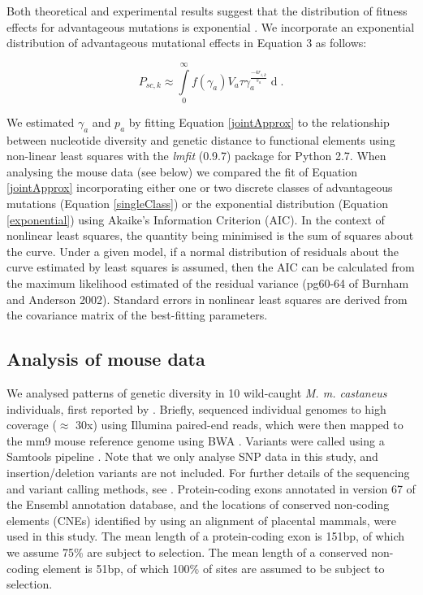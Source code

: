 	Both theoretical and experimental results suggest that the distribution of fitness effects for advantageous mutations is exponential \citep{RN109}. We incorporate an exponential distribution of advantageous mutational effects in Equation 3 as follows:

		\begin{equation}
		\label{exponential}
P_{sc,k} \approx \int \limits_{0}^{\infty} f(\gamma_a) V_a \tau\gamma_a^{\frac{-4r_{i,k}}{s_a}} \mathop{d\gamma_a}.
		\end{equation}

	We estimated $\gamma_a$ and $p_a$ by fitting Equation \ref{jointApprox} to the relationship between nucleotide diversity and genetic distance to functional elements using non-linear least squares with the \emph{lmfit} (0.9.7) package for Python 2.7. When analysing the mouse data (see below) we compared the fit of Equation \ref{jointApprox} incorporating either one or two discrete classes of advantageous mutations (Equation \ref{singleClass}) or the exponential distribution (Equation \ref{exponential}) using Akaike's Information Criterion (AIC). In the context of nonlinear least squares, the quantity being minimised is the sum of squares about the curve. Under a given model, if a normal distribution of residuals about the curve estimated by least squares is assumed, then the AIC can be calculated from the maximum likelihood estimated of the residual variance (pg60-64 of Burnham and Anderson 2002). Standard errors in nonlinear least squares are derived from the covariance matrix of the best-fitting parameters.
		
	\subsection{Analysis of mouse data}

	We analysed patterns of genetic diversity in 10 wild-caught \textit{M. m. castaneus} individuals, first reported by \cite{RN122}. Briefly, \cite{RN122} sequenced individual genomes to high coverage ($\approx$ 30x) using Illumina paired-end reads, which were then mapped to the mm9 mouse reference genome using BWA \citep{RN251}. Variants were called using a Samtools pipeline \citep{RN252}. Note that we only analyse SNP data in this study, and insertion/deletion variants are not included. For further details of the sequencing and variant calling methods, see \cite{RN122}. Protein-coding exons annotated in version 67 of the Ensembl annotation database, and the locations of conserved non-coding elements (CNEs) identified by \cite{RN122} using an alignment of placental mammals, were used in this study. The mean length of a protein-coding exon is 151bp, of which we assume 75\% are subject to selection. The mean length of a conserved non-coding element is 51bp, of which 100\% of sites are assumed to be subject to selection.

